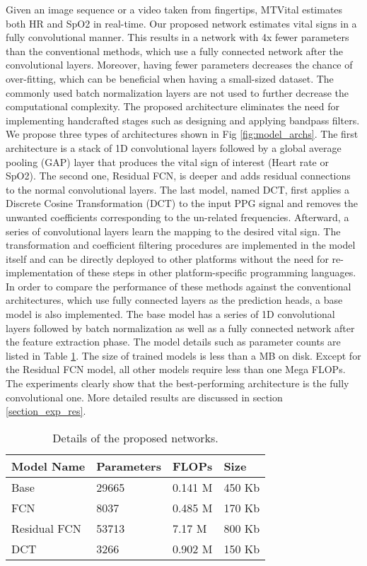 \documentclass[conference]{IEEEtran}
\begin{document}
Given an image sequence or a video taken from fingertips, MTVital estimates both HR and SpO2 in real-time. Our proposed network estimates vital signs in a fully convolutional manner. This results in a network with 4x fewer parameters than the conventional methods, which use a fully connected network after the convolutional layers. Moreover, having fewer parameters decreases the chance of over-fitting, which can be beneficial when having a small-sized dataset. The commonly used batch normalization layers are not used to further decrease the computational complexity. The proposed architecture eliminates the need for implementing handcrafted stages such as designing and applying bandpass filters. We propose three types of architectures shown in Fig \ref{fig:model_archs}. The first architecture is a stack of 1D convolutional layers followed by a global average pooling (GAP) layer that produces the vital sign of interest (Heart rate or SpO2). The second one, Residual FCN, is deeper and adds residual connections to the normal convolutional layers. The last model, named DCT, first applies a Discrete Cosine Transformation (DCT) to the input PPG signal and removes the unwanted coefficients corresponding to the un-related frequencies. Afterward, a series of convolutional layers learn the mapping to the desired vital sign. The transformation and coefficient filtering procedures are implemented in the model itself and can be directly deployed to other platforms without the need for re-implementation of these steps in other platform-specific programming languages. In order to compare the performance of these methods against the conventional architectures, which use fully connected layers as the prediction heads, a base model is also implemented. The base model has a series of 1D convolutional layers followed by batch normalization as well as a fully connected network after the feature extraction phase. The model details such as parameter counts are listed in Table \ref{table:model-details}. The size of trained models is less than a MB on disk. Except for the Residual FCN model, all other models require less than one Mega FLOPs. The experiments clearly show that the best-performing architecture is the fully convolutional one. More detailed results are discussed in section \ref{section_exp_res}.

\begin{table}[h]
\begin{center}
\caption{Details of the proposed networks.}
\label{table:model-details}
\begin{tabular}{llll}
\toprule
Model Name & Parameters  & FLOPs  & Size \\ \hline
Base                    & 29665 & 0.141 M  & 450 Kb     \\
FCN                   & 8037 & 0.485 M  & 170 Kb     \\
Residual FCN             & 53713 & 7.17 M & 800 Kb     \\
DCT                  & 3266 & 0.902 M & 150 Kb \\
\bottomrule
\end{tabular}
\end{center}
\end{table}
\end{document}
